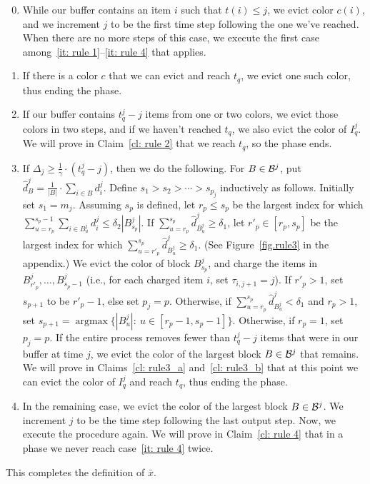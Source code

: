 \documentclass[11pt]{article}
\DeclareMathOperator{\argmax}{argmax}
\begin{document}
\begin{enumerate}
\setcounter{enumi}{-1}
\item\label{it: rule 0} While our buffer contains an item $i$ such that
         $t(i)\le j$, we evict color $c(i)$, and we increment $j$
         to be the first time step following the one we've reached. When
         there are no more steps of this case, we execute the first case
         among~\ref{it: rule 1}--\ref{it: rule 4} that applies.
\item\label{it: rule 1} If there is a color $c$ that we can evict and
         reach $t_q$, we evict one such color, thus ending the phase.
\item\label{it: rule 2} If our buffer contains $t^j_q - j$ items from one
         or two colors, we evict those colors in two steps, and if we haven't
         reached $t_q$, we also evict the color of $I^j_q$. We
         will prove in Claim~\ref{cl: rule 2} that we reach $t_q$, so the phase
         ends.
\item\label{it: rule 3} If $\Delta_j\ge\frac{1}{\gamma}\cdot (t^j_q - j)$,
         then we do the following. For $B\in {\cal B}^j$, put
         $\hat{d}^j_B = \frac{1}{|B|}\cdot\sum_{i\in B} d^j_i$. Define
         $s_1 > s_2 > \cdots > s_{p_j}$ inductively as follows. Initially
         set $s_1 = m_j$. Assuming $s_p$ is defined, let $r_p\le s_p$ be the
         largest index for which
         $\sum_{u=r_p}^{s_p-1} \sum_{i\in B^j_u} d^j_i\le \delta_2 |B^j_{s_p}|$.
         If $\sum_{u=r_p}^{s_p} \hat{d}^j_{B^j_u} \ge \delta_1$,
         let $r'_p\in [r_p,s_p]$ be the largest index for which
         $\sum_{u=r'_p}^{s_p} \hat{d}^j_{B^j_u} \ge \delta_1$.
         (See Figure~\ref{fig.rule3} in the appendix.)
         We evict the color of block $B^j_{s_p}$, and charge the items in
         $B^j_{r'_p},\dots,B^j_{s_p-1}$
         (i.e., for each charged item $i$, set $\tau_{i,j+1} = j$). If $r'_p > 1$,
         set $s_{p+1}$ to be $r'_p-1$, else set $p_j = p$.
         Otherwise, if $\sum_{u=r_p}^{s_p} \hat{d}^j_{B^j_u} < \delta_1$
         and $r_p > 1$, set $s_{p+1} = \argmax\{|B^j_u|:\ u\in [r_p-1,s_p-1]\}$. 
         Otherwise, if $r_p = 1$, set $p_j = p$.
         If the entire process removes fewer than $t^j_q - j$ 
         items that were in our buffer at time $j$,
         we evict the color of the largest block $B\in {\cal B}^j$
         that remains. We will prove in Claims~\ref{cl: rule3_a} and~\ref{cl: rule3_b}
         that at this point we can evict the color of $I^j_q$ and reach $t_q$, thus
         ending the phase.
\item\label{it: rule 4} In the remaining case,
we evict the color of the largest block $B\in {\cal B}^j$.
         We increment $j$
         to be the time step following the last output step. Now, we
         execute the procedure again. We will prove in Claim~\ref{cl: rule 4}
         that in a phase we never reach case~\ref{it: rule 4} twice.
\end{enumerate}
This completes the definition of $\bar{x}$.
\end{document}

